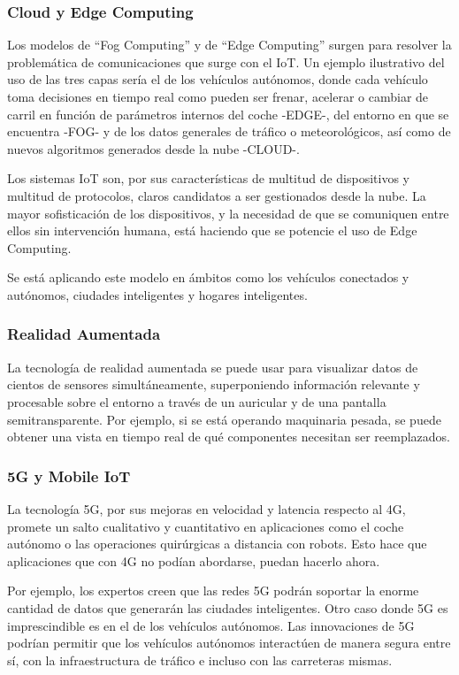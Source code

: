 \documentclass[12pt]{article}
\begin{document}
  \subsubsection*{Cloud y Edge Computing}
  Los modelos de ``Fog Computing'' y de ``Edge Computing'' surgen para resolver la problemática de comunicaciones que surge con el IoT. Un ejemplo ilustrativo del uso de las tres capas sería el de los vehículos autónomos, donde cada vehículo toma decisiones en tiempo real como pueden ser frenar, acelerar o cambiar de carril en función de parámetros internos del coche -EDGE-, del entorno en que se encuentra -FOG- y de los datos generales de tráfico o meteorológicos, así como de nuevos algoritmos generados desde la nube -CLOUD-.

  Los sistemas IoT son, por sus características de multitud de dispositivos y multitud de protocolos, claros candidatos a ser gestionados desde la nube. La mayor sofisticación de los dispositivos, y la necesidad de que se comuniquen entre ellos sin intervención humana, está haciendo que se potencie el uso de Edge Computing.

  Se está aplicando este modelo en ámbitos como los vehículos conectados y autónomos, ciudades inteligentes y hogares inteligentes.

  \subsubsection*{Realidad Aumentada}
  La tecnología de realidad aumentada se puede usar para visualizar datos de cientos de sensores simultáneamente, superponiendo información relevante y procesable sobre el entorno a través de un auricular y de una pantalla semitransparente. Por ejemplo, si se está operando maquinaria pesada, se puede obtener una vista en tiempo real de qué componentes necesitan ser reemplazados.

  \subsubsection*{5G y Mobile IoT}
  La tecnología 5G, por sus mejoras en velocidad y latencia respecto al 4G, promete un salto cualitativo y cuantitativo en aplicaciones como el coche autónomo o las operaciones quirúrgicas a distancia con robots. Esto hace que aplicaciones que con 4G no podían abordarse, puedan hacerlo ahora.

  Por ejemplo, los expertos creen que las redes 5G podrán soportar la enorme cantidad de datos que generarán las ciudades inteligentes. Otro caso donde 5G es imprescindible es en el de los vehículos autónomos. Las innovaciones de 5G podrían permitir que los vehículos autónomos interactúen de manera segura entre sí, con la infraestructura de tráfico e incluso con las carreteras mismas.
\end{document}
